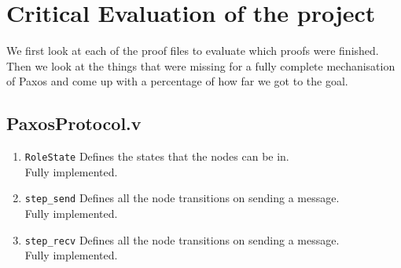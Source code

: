 \vspace{-5mm}
\section{Critical Evaluation of the project}
We first look at each of the proof files to evaluate which proofs
were finished. Then we look at the things that were missing for a fully
complete mechanisation of Paxos and come up with a percentage of how far we
got to the goal.

\subsection{PaxosProtocol.v}
\begin{enumerate}
  \item \texttt{RoleState}
  Defines the states that the nodes can be in. \\
  Fully implemented.
  \item \texttt{step\_send}
  Defines all the node transitions on sending a message. \\
  Fully implemented.
  \item \texttt{step\_recv}
  Defines all the node transitions on sending a message. \\
  Fully implemented.
\end{enumerate}

\vspace{-5mm}
